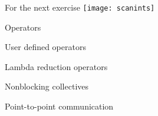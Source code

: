 \documentclass[10pt]{beamer}
\begin{document}
\begin{numberedframe}{For the next exercise}
  \label{fig:scanints}
  \texttt{[image: scanints]}
\end{numberedframe}
\begin{exerciseframe}[scangather]
  
\end{exerciseframe}
\begin{exerciseframe}[scangather]
  
\end{exerciseframe}

\begin{numberedframe}{Operators}
  
\end{numberedframe}
\begin{numberedframe}{User defined operators}
  
\end{numberedframe}
\begin{numberedframe}{Lambda reduction operators}
  
\end{numberedframe}
\begin{numberedframe}{Nonblocking collectives}
  
\end{numberedframe}

 {Point-to-point communication}
\end{document}
